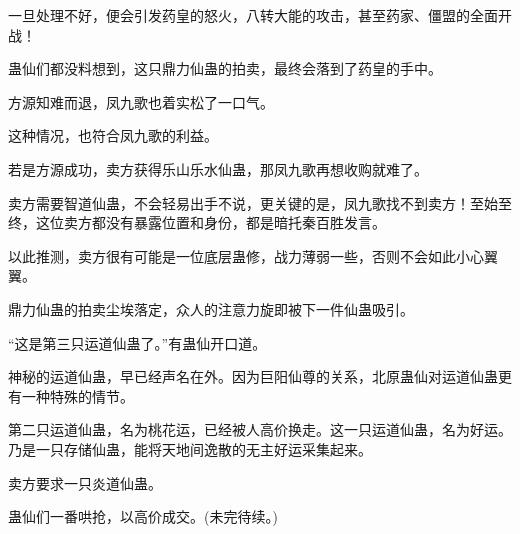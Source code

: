\begin{this_body}
一旦处理不好，便会引发药皇的怒火，八转大能的攻击，甚至药家、僵盟的全面开战！

蛊仙们都没料想到，这只鼎力仙蛊的拍卖，最终会落到了药皇的手中。

方源知难而退，凤九歌也着实松了一口气。

这种情况，也符合凤九歌的利益。

若是方源成功，卖方获得乐山乐水仙蛊，那凤九歌再想收购就难了。

卖方需要智道仙蛊，不会轻易出手不说，更关键的是，凤九歌找不到卖方！至始至终，这位卖方都没有暴露位置和身份，都是暗托秦百胜发言。

以此推测，卖方很有可能是一位底层蛊修，战力薄弱一些，否则不会如此小心翼翼。

鼎力仙蛊的拍卖尘埃落定，众人的注意力旋即被下一件仙蛊吸引。

“这是第三只运道仙蛊了。”有蛊仙开口道。

神秘的运道仙蛊，早已经声名在外。因为巨阳仙尊的关系，北原蛊仙对运道仙蛊更有一种特殊的情节。

第二只运道仙蛊，名为桃花运，已经被人高价换走。这一只运道仙蛊，名为好运。乃是一只存储仙蛊，能将天地间逸散的无主好运采集起来。

卖方要求一只炎道仙蛊。

蛊仙们一番哄抢，以高价成交。(未完待续。)

\end{this_body}

